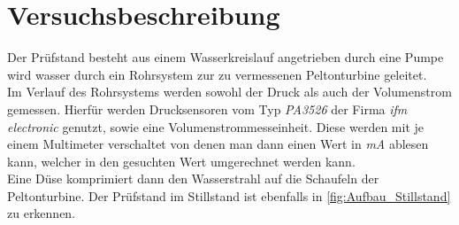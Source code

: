 \section{Versuchsbeschreibung}
\label{section:Versuchsbeschreibung}
%
Der Prüfstand besteht aus einem Wasserkreislauf angetrieben durch eine Pumpe wird wasser durch ein Rohrsystem zur zu vermessenen Peltonturbine geleitet.\\
Im Verlauf des Rohrsystems werden sowohl der Druck als auch der Volumenstrom gemessen.
Hierfür werden Drucksensoren vom Typ \textit{PA3526} der Firma \textit{ifm electronic} genutzt, sowie eine Volumenstrommesseinheit.
Diese werden mit je einem Multimeter verschaltet von denen man dann einen Wert in \textit{mA} ablesen kann, welcher in den gesuchten Wert umgerechnet werden kann.\\
Eine Düse komprimiert dann den Wasserstrahl auf die Schaufeln der Peltonturbine.
Der Prüfstand im Stillstand ist ebenfalls in \autoref{fig:Aufbau_Stillstand} zu erkennen.\\
%
